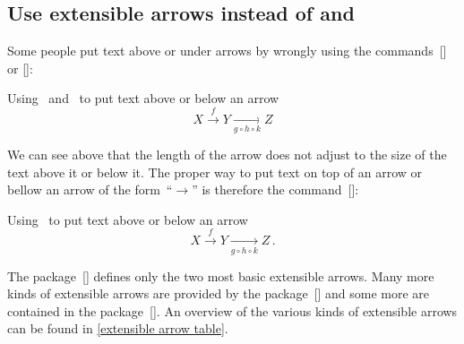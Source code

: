 \subsection{Use extensible arrows instead of  and }
\label{extensible arrows}

Some people put text above or under arrows by wrongly using the commands~[\comname] or [\comname]:
\begin{showlatex}{Using~ and~ to put text above or below an arrow}
\[
  X
  \overset{f}{\longrightarrow}
  Y
  \underset{g \circ h \circ k}{\longrightarrow}
  Z
\]
\end{showlatex}
We can see above that the length of the arrow does not adjust to the size of the text above it or below it.
The proper way to put text on top of an arrow or bellow an arrow of the form~\enquote{$\to$} is therefore the command~[\comname]:
\begin{showlatex}{Using~ to put text above or below an arrow}
\[
  X
  \xrightarrow{f}
  Y
  \xrightarrow[g \circ h \circ k]{}
  Z \,.
\]
\end{showlatex}
The package~[\packname] defines only the two most basic extensible arrows.
Many more kinds of extensible arrows are provided by the package~[\packname] and some more are contained in the package~[\packname].
An overview of the various kinds of extensible arrows can be found in \cref{extensible arrow table}.
